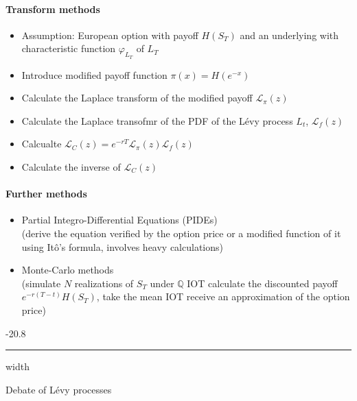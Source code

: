 \documentclass[a4paper,landscape,7pt,fleqn]{scrartcl}
\makeatletter
\renewcommand{\subsubsection}{\@startsection{subsubsection}{1}{0mm}%
{-2\baselineskip}{0.8\baselineskip}%
{\hrule depth 0.2pt width\columnwidth\vspace*{1.2em}\normalsize\bfseries}}
\makeatother
\begin{document}
\begin{multicols*}{3}
\paragraph{Transform methods}
\begin{itemize}
\item Assumption: European option with payoff $H(S_T)$ and an underlying with characteristic function $\varphi_{L_T}$ of $L_T$
\item Introduce modified payoff function $\pi(x) = H(e^{-x})$
\item Calculate the Laplace transform of the modified payoff $\mathcal{L}_\pi(z)$
\item Calculate the Laplace transofmr of the PDF of the Lévy process $L_t$, $\mathcal{L}_f(z)$
\item Calcualte $\mathcal{L}_C(z) = e^{-rT} \mathcal{L}_\pi(z) \mathcal{L}_f(z)$
\item Calculate the inverse of $\mathcal{L}_C(z)$
\end{itemize}

\paragraph{Further methods}
\begin{itemize}
\item Partial Integro-Differential Equations (PIDEs) \\
(derive the equation verified by the option price or a modified function of it using Itô's formula, involves heavy calculations)
\item Monte-Carlo methods \\
(simulate $N$ realizations of $S_T$ under $\mathbb{Q}$ IOT calculate the discounted payoff $e^{-r (T-t)} H(S_T)$, take the mean IOT receive an approximation of the option price)
\end{itemize}

\subsubsection{Debate of Lévy processes}


\end{multicols*}
\end{document}
